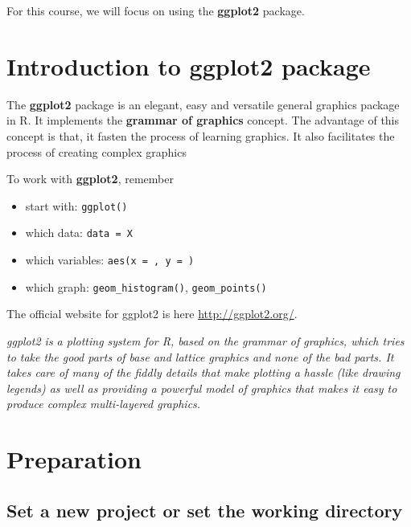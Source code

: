 \documentclass[
]{book}
\providecommand{\tightlist}{%
  \setlength{\itemsep}{0pt}\setlength{\parskip}{0pt}}
\begin{document}
For this course, we will focus on using the \textbf{ggplot2} package.

\hypertarget{introduction-to-ggplot2-package}{%
\section{\texorpdfstring{Introduction to \textbf{ggplot2} package}{Introduction to ggplot2 package}}\label{introduction-to-ggplot2-package}}

The \textbf{ggplot2} package is an elegant, easy and versatile general graphics package in R. It implements the \textbf{grammar of graphics} concept. The advantage of this concept is that, it fasten the process of learning graphics. It also facilitates the process of creating complex graphics

To work with \textbf{ggplot2}, remember

\begin{itemize}
\tightlist
\item
  start with: \texttt{ggplot()}
\item
  which data: \texttt{data\ =\ X}
\item
  which variables: \texttt{aes(x\ =\ ,\ y\ =\ )}
\item
  which graph: \texttt{geom\_histogram()}, \texttt{geom\_points()}
\end{itemize}

The official website for ggplot2 is here \url{http://ggplot2.org/}.

\emph{ggplot2 is a plotting system for R, based on the grammar of graphics, which tries to take the good parts of base and lattice graphics and none of the bad parts. It takes care of many of the fiddly details that make plotting a hassle (like drawing legends) as well as providing a powerful model of graphics that makes it easy to produce complex multi-layered graphics.}

\hypertarget{preparation}{%
\section{Preparation}\label{preparation}}

\hypertarget{set-a-new-project-or-set-the-working-directory}{%
\subsection{Set a new project or set the working directory}\label{set-a-new-project-or-set-the-working-directory}}
\end{document}
